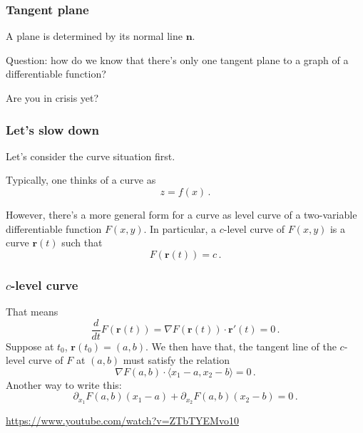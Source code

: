 \documentclass[aspectratio=169]{beamer}
\newcommand{\vect}{\mathbf}
\begin{document}
\begin{frame}
    \frametitle{ Tangent plane }
    A plane is determined by its  normal line $\vect{n}$.

    Question: how do we know that there's only one tangent plane to a graph of 
    a differentiable function?

    \pause
    Are you in crisis yet?
\end{frame}

\begin{frame}
    \frametitle{ Let's slow down }
    Let's consider the curve situation first.

    Typically, one thinks of a curve as
    \begin{equation*}
        z = f(x)\,.
    \end{equation*}

    However, there's a more general form for a curve as level curve of a two-variable
    differentiable function $F(x,y)$.
    In particular, a $c$-level curve of $F(x,y)$
    is a curve $\vect{r}(t)$ such that
    \begin{equation*}
        F(\vect{r}(t)) = c \,.
    \end{equation*}
\end{frame}

\begin{frame}
    \frametitle{ $c$-level curve }
    That means 
    \begin{equation*}
        \frac{d}{dt} F(\vect{r}(t)) = \nabla F (\vect{r}(t)) \cdot \vect{r}'(t)= 0 \,.
    \end{equation*}
    Suppose at $t_0$, $\vect{r}(t_0) = ( a,b )$.
    We then have that, the tangent line of the $c$-level curve of $F$ at $(a,b)$
    must satisfy the relation
    \begin{equation*}
        \nabla F(a,b) \cdot \langle x_1 - a, x_2 - b \rangle = 0\,.
    \end{equation*}
    Another way to write this:
    \begin{equation*}
        \partial_{x_1} F (a,b) (x_1 -a ) + \partial_{x_2} F(a,b) (x_2 - b) = 0\,.
    \end{equation*}

    \url{https://www.youtube.com/watch?v=ZTbTYEMvo10}

\end{frame}
\end{document}
